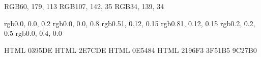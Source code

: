 



\definecolor{SeaGreen}    {RGB}{60,  179, 113}
\definecolor{OliveGreen}  {RGB}{107, 142, 35}
\definecolor{ForestGreen} {RGB}{34,  139, 34}

\definecolor{DarkBlue}     {rgb}{0.0,  0.0,  0.2}
\definecolor{HeraldBlue}   {rgb}{0.0,  0.0,  0.8}
\definecolor{HeraldRed}    {rgb}{0.51, 0.12, 0.15}
\definecolor{HeraldRed2}   {rgb}{0.81, 0.12, 0.15}
\definecolor{HeraldGray}   {rgb}{0.2,  0.2,  0.5}
\definecolor{HeraldGreen}  {rgb}{0.0,  0.4,  0.0}

\definecolor{pblue}         {HTML} {0395DE}
\definecolor{gblue}         {HTML} {2E7CDE}
\definecolor{mainblue}      {HTML} {0E5484}
\definecolor{materialblue}  {HTML} {2196F3}
\definecolor{materialindigo}{HTML} {3F51B5}
\definecolor{materialpurple}{HTML} {9C27B0}


\ifdefined\SHORT
\else
	\def\SHORT{0}
\fi

\newcommand{\refscolor} {blue}
\newcommand{\linkscolor}{HeraldRed}
\newcommand{\urlscolor} {gblue}

\hypersetup{
	colorlinks,breaklinks,
	linkcolor   = \linkscolor,
	urlcolor    = \urlscolor,
	citecolor   = \refscolor,
	anchorcolor = black
}


\newcommand*{\eg}{e.g.,\@\xspace}
\newcommand*{\ie}{i.e.,\@\xspace}
\newcommand*{\etc}{etc.\@\xspace}
\newcommand*{\addthinspace}{\hskip0.16667em\relax}
\newcommand{\mytilde}{\raise.17ex\hbox{$\scriptstyle\mathtt{\sim}$}}


\def\first {$(i)$\xspace}
\def\second{$(ii)$\xspace}
\def\third {$(iii)$\xspace}
\def\fourth{$(iv)$\xspace}
\def\fifth {$(v)$\xspace}
\def\sixth {$(vi)$\xspace}


\newcommand{\smartparagraph}[1]{\noindent{\textbf{#1}}\ }
\newcommand{\opening}[1]{\noindent{#1}\ \vspace{+0.5em}}
\newcommand{\closing}[1]{\vspace{+0.5em} \noindent{#1}\ }


\newcommand*{\link}[2][]{\href{#2}%
    {\ifthenelse{\equal{#1}{}}{#2}{#1}}}


\renewcommand{\thefootnote}{\fnsymbol{footnote}}


